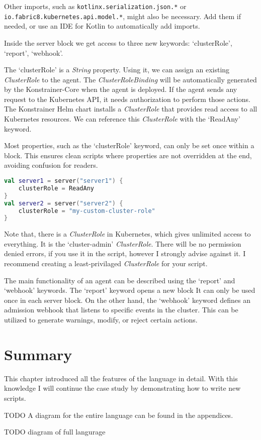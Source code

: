 Other imports, such as \lstinline|kotlinx.serialization.json.*| or \lstinline|io.fabric8.kubernetes.api.model.*|, might also be necessary. Add them if needed, or use an IDE for Kotlin to automatically add imports.

Inside the server block we get access to three new keywords: `clusterRole', `report', `webhook'.

The `clusterRole' is a \emph{String} property. Using it, we can assign an existing \emph{ClusterRole} to the agent. The \emph{ClusterRoleBinding} will be automatically generated by the Konstrainer-Core when the agent is deployed. If the agent sends any request to the Kubernetes API, it needs authorization to perform those actions. The Konstrainer Helm chart installs a \emph{ClusterRole} that provides read access to all Kubernetes resources. We can reference this \emph{ClusterRole} with the `ReadAny' keyword.

Most properties, such as the `clusterRole' keyword, can only be set once within a block. This ensures clean scripts where properties are not overridden at the end, avoiding confusion for readers.

\begin{lstlisting}[caption={Usage of the clusterRole keyword},language=Kotlin,label=code:clusterrole_usage]
val server1 = server("server1") {
    clusterRole = ReadAny
}
val server2 = server("server2") {
    clusterRole = "my-custom-cluster-role"
}
\end{lstlisting}

Note that, there is a \emph{ClusterRole} in Kubernetes, which gives unlimited access to everything. It is the `cluster-admin' \emph{ClusterRole}. There will be no permission denied errors, if you use it in the script, however I strongly advise against it. I recommend creating a least-privilaged \emph{ClusterRole} for your script.

The main functionality of an agent can be described using the `report' and `webhook' keywords. The `report' keyword opens a new block It can only be used once in each server block. On the other hand, the `webhook' keyword defines an admission webhook that listens to specific events in the cluster. This can be utilized to generate warnings, modify, or reject certain actions.





\section{Summary}

This chapter introduced all the features of the language in detail. With this knowledge I will continue the case study by demonstrating how to write new scripts.

TODO A diagram for the entire language can be found in the appendices.

TODO diagram of full langurage


